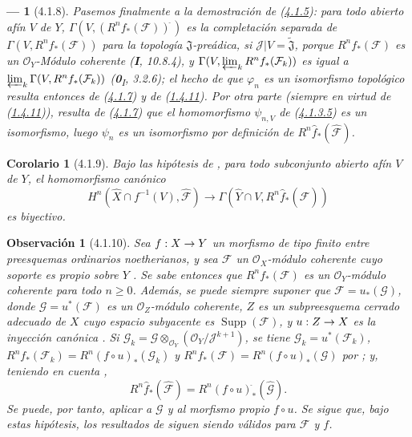 \documentclass[10pt,oneside,openany]{book}
\theoremstyle{egaenv}\newtheorem*{env}{---}
\theoremstyle{egastatement}
\newtheorem*{corollary}{Corolario}
\theoremstyle{egadescription}
\newtheorem*{remark}{Observación}
\renewcommand{\geq}{\geqslant}
\renewcommand{\to}{\mathchoice{\longrightarrow}{\rightarrow}{\rightarrow}{\rightarrow}}
\begin{document}
\begin{env}[4.1.8]
\label{III.4.1.8-fr}
Pasemos finalmente a la demostración de (\hyperref[III.4.1.5-fr]{4.1.5}): para todo abierto afín $V$ de $Y$,
$\Gamma(V,(R^nf_*(\mathcal F))^{\widehat{\,}})$
es la completación separada de
$\Gamma(V,R^nf_*(\mathcal F))$ para la topología
$\mathfrak J$-preádica, si
$\mathcal J|V=\widetilde{\mathfrak J}$, porque
$R^nf_*(\mathcal F)$ es un $\mathcal O_Y$-Módulo coherente (\textbf{I}, 10.8.4),
y $\Gamma(V,\varprojlim_kR^nf_*(\mathcal F_k))$ es igual a
$\varprojlim_k\Gamma(V,R^nf_*(\mathcal F_k))$
(\textbf{0}\textsubscript{I}, 3.2.6); el hecho de que $\varphi_n$ es un isomorfismo topológico resulta entonces de (\hyperref[III.4.1.7-fr]{4.1.7}) y de (\hyperref[III.1.4.11-fr]{1.4.11}). Por otra parte (siempre en virtud de (\hyperref[III.1.4.11-fr]{1.4.11})), resulta de (\hyperref[III.4.1.7-fr]{4.1.7}) que el homomorfismo $\psi_{n,V}$ de
(\hyperref[III.4.1.3.5-fr]{4.1.3.5}) es un \emph{isomorfismo}, luego $\psi_n$
es un isomorfismo por definición de
$R^n\widehat f_*(\widehat{\mathcal F})$.
\end{env}

\begin{corollary}[4.1.9]
\label{III.4.1.9}
\label{III.4.1.9-fr}
Bajo las hipótesis de \textup{}, para todo subconjunto abierto
afín $V$ de $Y$, el homomorfismo canónico
\[
H^n(\widehat X\cap f^{-1}(V),\widehat{\mathcal F})
\longrightarrow\Gamma(\widehat Y\cap V,
R^n\widehat f_*(\widehat{\mathcal F}))
\]
es biyectivo.
\end{corollary}

\begin{remark}[4.1.10]
\label{III.4.1.10}
\label{III.4.1.10-fr}
Sea $f:X\to Y$ un morfismo \emph{de tipo finito} entre preesquemas ordinarios
noetherianos, y sea $\mathcal F$ un $\mathcal O_X$-módulo coherente cuyo
soporte es \emph{propio sobre} $Y$ .
Se sabe entonces  que $R^nf_*(\mathcal F)$ es un
$\mathcal O_Y$-módulo coherente para todo $n\geq0$. Además, se puede
siempre suponer que $\mathcal F=u_*(\mathcal G)$, donde
$\mathcal G=u^*(\mathcal F)$ es un $\mathcal O_Z$-módulo coherente, $Z$ es un
subpreesquema cerrado adecuado de $X$ cuyo espacio subyacente es
$\operatorname{Supp}(\mathcal F)$, y $u:Z\to X$ es la inyección canónica
.
Si
$\mathcal G_k=\mathcal G\otimes_{\mathcal O_Y}
(\mathcal O_Y/\mathcal J^{k+1})$,
se tiene $\mathcal G_k=u^*(\mathcal F_k)$,
$R^nf_*(\mathcal F_k)=R^n(f\circ u)_*(\mathcal G_k)$ y
$R^nf_*(\mathcal F)=R^n(f\circ u)_*(\mathcal G)$
por ; y, teniendo en cuenta ,
\[
R^n\widehat f_*(\widehat{\mathcal F})
=R^n(f\circ u)^{\widehat{\,}}_*(\widehat{\mathcal G}).
\]
Se puede, por tanto, aplicar  a $\mathcal G$ y al morfismo
propio $f\circ u$.
Se sigue que, bajo estas hipótesis, \emph{los resultados de}
 \emph{siguen siendo válidos para} $\mathcal F$ \emph{y} $f$.
\end{remark}
\end{document}
